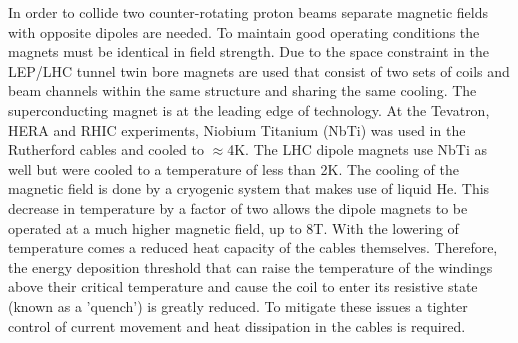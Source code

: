 In order to collide two counter-rotating proton beams separate magnetic fields
with opposite dipoles are needed. To maintain good operating conditions
the magnets must be identical in field strength. 
Due to the space constraint in the LEP/LHC
tunnel twin bore magnets are used that consist of two sets of 
coils and beam channels within the same structure and
sharing the same cooling. 
The superconducting magnet is at the leading edge of technology.
At the Tevatron, HERA and RHIC experiments, Niobium Titanium (NbTi)
was used in the Rutherford cables and cooled to $\approx$4K. 
The LHC dipole magnets use NbTi as well but were cooled
to a temperature of less than 2K. 
The cooling of the magnetic field is done%
by a cryogenic system that makes use of liquid He.
This decrease in temperature
by a factor of two allows the dipole magnets to be operated 
at a much higher magnetic field, up to 8T. With the lowering of
temperature comes a reduced heat capacity of the cables themselves.
Therefore, the energy deposition threshold that can raise the 
temperature of the windings above their critical temperature and
cause the coil to enter its resistive state (known as a 'quench') is greatly
reduced. To mitigate these issues a tighter control of current movement
and heat dissipation in the cables is required. 

